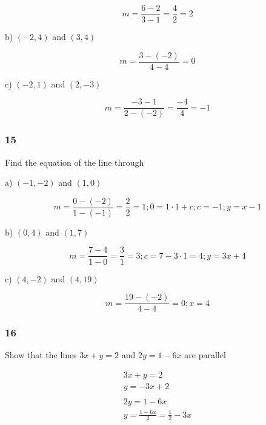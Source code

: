 \documentclass[]{report}
\begin{document}

\[
	m = \frac{6 - 2}{3 - 1} = \frac{4}{2} = 2
\]

b) $(-2, 4)$ and $(3, 4)$


\[
m = \frac{3 - (-2)}{4-4} = 0
\]

c) $(-2, 1)$ and $(2, -3)$


\[
	m = \frac{-3 - 1}{2 - (-2)} = \frac{-4}{4} = -1 
\]


\subsubsection{15}

Find the equation of the line through

a) $(-1, -2)$ and $(1, 0)$

\[
m = \frac{0 - (-2)}{1 - (-1)} = \frac{2}{2} = 1; 0 = 1 \cdot 1 + c; c = -1; y = x - 1
\]

b) $(0, 4)$ and $(1, 7)$

\[
m = \frac{7 - 4}{1 - 0} = \frac{3}{1} = 3; c = 7 - 3\cdot 1 = 4; y = 3x + 4
\]

c) $(4, -2)$ and $(4, 19)$

\[
m = \frac{19 - (-2)}{4 - 4} = 0; x = 4
\]


\subsubsection{16}

Show that the lines $3x + y = 2$ and $2y = 1- 6x$ are parallel

\begin{align*}
3x + y = 2 \tag{Equation 1}\\
y = -3x + 2 \tag{when rearranged}\\
\\
2y = 1 - 6x \tag{Equation 2}	\\
y = \frac{1 - 6x}{2} = \frac{1}{2} - 3x \tag{when rearranged}
\end{align*}
\end{document}
